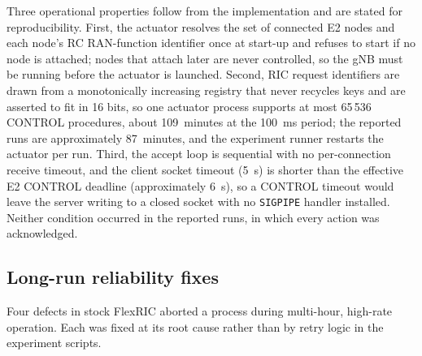 Three operational properties follow from the implementation and are stated for reproducibility. First, the actuator resolves the set of connected E2 nodes and each node's RC RAN-function identifier once at start-up and refuses to start if no node is attached; nodes that attach later are never controlled, so the gNB must be running before the actuator is launched. Second, RIC request identifiers are drawn from a monotonically increasing registry that never recycles keys and are asserted to fit in 16 bits, so one actuator process supports at most 65\,536 CONTROL procedures, about 109~minutes at the 100~ms period; the reported runs are approximately 87~minutes, and the experiment runner restarts the actuator per run. Third, the accept loop is sequential with no per-connection receive timeout, and the client socket timeout (5~s) is shorter than the effective E2 CONTROL deadline (approximately 6~s), so a CONTROL timeout would leave the server writing to a closed socket with no \texttt{SIGPIPE} handler installed. Neither condition occurred in the reported runs, in which every action was acknowledged.

\subsection{Long-run reliability fixes}
\label{subsec:oai-reliability}
Four defects in stock FlexRIC aborted a process during multi-hour, high-rate operation. Each was fixed at its root cause rather than by retry logic in the experiment scripts.

